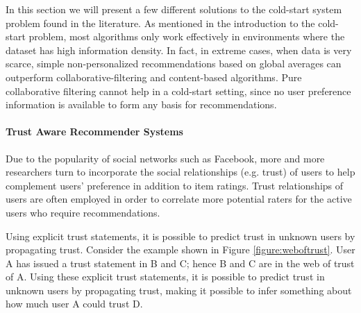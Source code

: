 In this section we will present a few different solutions to the cold-start
system problem found in the literature. As mentioned in the introduction to the
cold-start problem, most algorithms only work effectively in environments where
the dataset has high information density. In fact, in extreme cases, when data
is very scarce, simple non-personalized recommendations based on global
averages can outperform collaborative-filtering and content-based algorithms.
Pure collaborative filtering cannot help in a cold-start setting, since no user
preference information is available to form any basis for recommendations.



\paragraph{Trust Aware Recommender Systems}


Due to the popularity of social networks such as Facebook, more and more
researchers turn to incorporate the social relationships (e.g. trust) of users
to help complement users’ preference in addition to item ratings. Trust
relationships of users are often employed in order to correlate more potential
raters for the active users who require recommendations.

Using explicit trust statements, it is possible to predict trust in unknown
users by propagating trust. Consider the example shown in Figure
\ref{figure:weboftrust}. User A has issued a trust statement in B and C; hence
B and C are in the web of trust of A. Using these explicit trust statements, it
is possible to predict trust in unknown users by propagating trust, making it
possible to infer something about how much user A could trust D.

